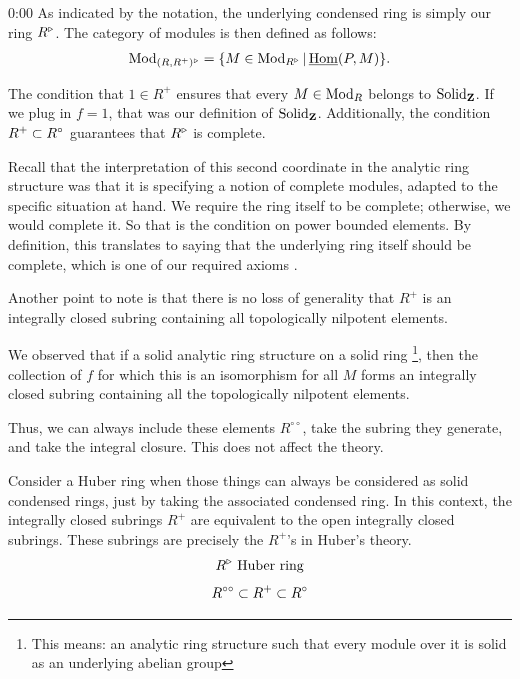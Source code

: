\begin{unfinished}{0:00}
As indicated by the notation, the underlying condensed ring is simply our ring $R^\triangleright$. The category of modules is then defined as follows:
\begin{align*}
\operatorname{Mod}_{(R, R^+)^\triangleright} = \{ M \in \operatorname{Mod}_{R^\triangleright} | \operatorname{\underline{Hom}}(P,M) \}.
\end{align*}

\begin{remark}
The condition that $1 \in R^+$ ensures that every $M \in \operatorname{Mod}_R$ belongs to $\mathrm{Solid}_\mathbf Z$. If we plug in $f = 1$, that was our definition of $\mathrm{Solid}_\mathbf Z$. Additionally, the condition $R^+ \subset R^\circ$ guarantees that $R^\triangleright$ is complete.
\end{remark}

Recall that the interpretation of this second coordinate in the analytic ring structure was that it is specifying a notion of complete modules, adapted to the specific situation at hand. 
We require the ring itself to be complete; otherwise, we would complete it. So that is the condition on power bounded elements. By definition, this translates to saying that the underlying ring itself should be complete, which is one of our required axioms .

\begin{remark}
Another point to note is that there is no loss of generality that $R^+$ is an integrally closed subring containing all topologically nilpotent elements. 

We observed that if a solid analytic ring structure on a solid ring \footnote{This means: an analytic ring structure  such that every module over it is solid as an underlying abelian group}, then the collection of $f$ for which this is an isomorphism for all $M$  forms an integrally closed subring containing all the topologically nilpotent elements. 

Thus, we can always include these elements $R^{\circ\circ}$, take the subring they generate, and take the integral closure. This does not affect the theory.
\end{remark}

\begin{example}
Consider a Huber ring when those things can always be considered as solid condensed rings, just by taking the associated condensed ring. In this context, the integrally closed subrings $R^+$ are equivalent to the open integrally closed subrings. These subrings are precisely the $R^+$'s in Huber's theory. 
\begin{align*}
R^\triangleright \text{ Huber ring}
\end{align*}
\begin{align*}
R^{\circ\circ} \subset R^+ \subset R^\circ
\end{align*}


\end{example}
\end{unfinished}

